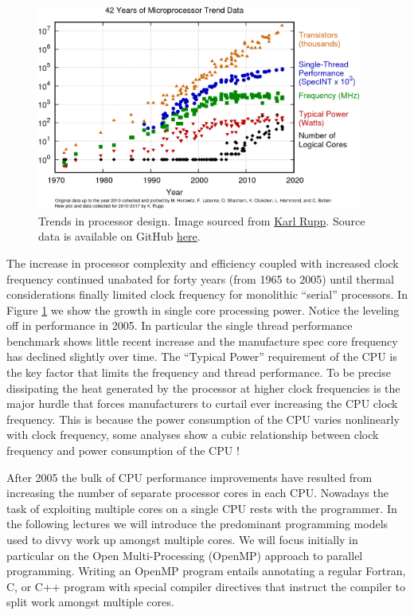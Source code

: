 \begin{figure}[htbp!]
    \centering
    \includegraphics[width=0.95\textwidth]{figures/L13/42-years-processor-trend.png}
    \caption{Trends in processor design. Image sourced from \href{https://www.karlrupp.net/2018/02/42-years-of-microprocessor-trend-data/}{Karl Rupp}. Source data is available on GitHub \href{data: https://github.com/karlrupp/microprocessor-trend-data}{here}.}
    \label{mooresLaw.fig}
\end{figure}


The increase in processor complexity and efficiency coupled with increased clock frequency continued unabated for forty years (from 1965 to 2005) until thermal considerations finally limited clock frequency for monolithic ``serial'' processors. In Figure \ref{mooresLaw.fig} we show the growth in single core processing power. Notice the leveling off in performance in 2005. In particular the single thread performance benchmark shows little recent increase and the manufacture spec core frequency has declined slightly over time. The ``Typical Power'' requirement of the CPU is the key factor that limits the frequency and thread performance. To be precise dissipating the heat generated by the processor at higher clock frequencies is the major hurdle that forces manufacturers to curtail ever increasing the CPU clock frequency. This is because the power consumption of the CPU varies nonlinearly with clock frequency, some analyses show a cubic relationship between clock frequency and power consumption of the CPU !

After 2005 the bulk of CPU performance improvements have resulted from increasing the number of separate processor cores in each CPU. Nowadays the task of exploiting multiple cores on a single CPU rests with the programmer. In the following lectures we will introduce the predominant programming models used to divvy work up amongst multiple cores. We will focus initially in particular on the Open Multi-Processing (OpenMP) approach to parallel programming. Writing an OpenMP program entails annotating a regular Fortran, C, or C++ program with special compiler directives that instruct the compiler to split work amongst multiple cores. 

